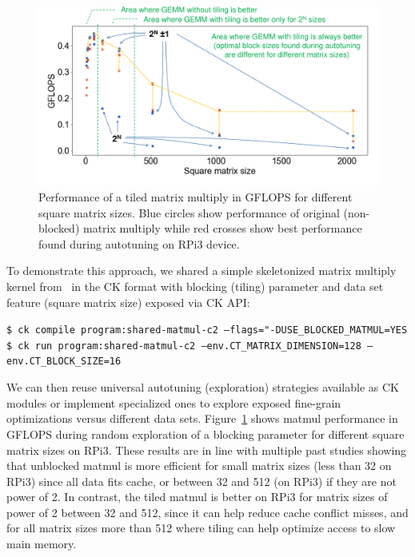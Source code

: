    \begin{figure}[!htbp]
     \centering
      \includegraphics[width=5.5in]
      {ck-assets/37a8224467be599e-cropped.pdf} %
     \caption{
      Performance of a tiled matrix multiply in GFLOPS for different square matrix sizes. 
      Blue circles show performance of original (non-blocked) matrix multiply
      while red crosses show best performance found during autotuning on RPi3 device.
     }                                         
     \label{fig:ck-datasets-input-aware-autotuning}
   \end{figure}

To demonstrate this approach, we shared a simple skeletonized 
matrix multiply kernel from~\cite{Fur2004} in the CK format 
with blocking (tiling) parameter and data set feature 
(square matrix size) exposed via CK API:

\begin{flushleft}
\texttt{\$ ck compile program:shared-matmul-c2 --flags="-DUSE\_BLOCKED\_MATMUL=YES}\newline
\texttt{\$ ck run program:shared-matmul-c2 --env.CT\_MATRIX\_DIMENSION=128 --env.CT\_BLOCK\_SIZE=16}\newline
\end{flushleft}

We can then reuse universal autotuning (exploration) strategies
available as CK modules or implement specialized ones to explore 
exposed fine-grain optimizations versus different data sets.
%
Figure~\ref{fig:ck-datasets-input-aware-autotuning} shows matmul performance
in GFLOPS during random exploration of a blocking parameter for different square 
matrix sizes on RPi3.
%
These results are in line with multiple past studies showing that
unblocked matmul is more efficient for small matrix sizes (less than 32
on RPi3) since all data fits cache, or between 32 and 512 (on RPi3) 
if they are not power of 2.
%
In contrast, the tiled matmul is better on RPi3 for matrix sizes of power of 2 between 32 and 512,
since it can help reduce cache conflict misses, and for all matrix sizes more than 512
where tiling can help optimize access to slow main memory.

